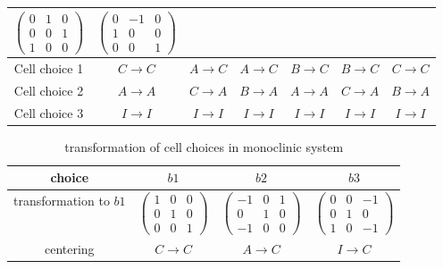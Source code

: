\begin{table}[htb]
\begin{tabular}{c|cccccc}
      $\begin{pmatrix} 0&1&0 \\ 0&0&1 \\ 1&0&0 \end{pmatrix}$ &
      $\begin{pmatrix} 0&-1&0 \\ 1&0&0 \\ 0&0&1 \end{pmatrix}$ \\
    \hline
    Cell choice 1 & $C \to C$ & $A \to C$ & $A \to C$ & $B \to C$ & $B \to C$ & $C \to C$ \\
    Cell choice 2 & $A \to A$ & $C \to A$ & $B \to A$ & $A \to A$ & $C \to A$ & $B \to A$ \\
    Cell choice 3 & $I \to I$ & $I \to I$ & $I \to I$ & $I \to I$ & $I \to I$ & $I \to I$ \\
    \hline
  \end{tabular}
\end{table}

\begin{table}[htb]
  \centering
  \caption{transformation of cell choices in monoclinic system}
  \label{table-monoclinic-cellchoice}
  \begin{tabular}{c|ccc}
    \hline
    choice                 & $b1$                                                & $b2$                                                  & $b3$                                                  \\
    \hline
    transformation to $b1$ & $\begin{pmatrix} 1&0&0\\0&1&0\\0&0&1 \end{pmatrix}$ & $\begin{pmatrix} -1&0&1\\0&1&0\\-1&0&0 \end{pmatrix}$ & $\begin{pmatrix} 0&0&-1\\0&1&0\\1&0&-1 \end{pmatrix}$ \\
    \hline
    centering              & $C \to C$                                           & $A \to C$                                             & $I \to C$                                             \\
    \hline
  \end{tabular}
\end{table}

